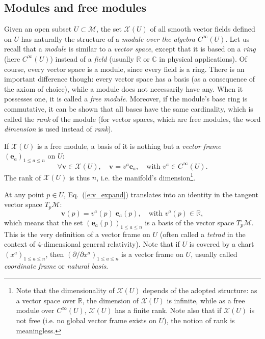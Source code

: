 \documentclass[a4paper]{jpconf}
\newcommand{\be}{\begin{equation}}
\newcommand{\ee}{\end{equation}}
\newcommand{\w}[1]{\bm{#1}}
\begin{document}
\subsection{Modules and free modules} \label{s:modules}

Given an open subset $U\subset\mathcal{M}$, the set $\mathscr{X}(U)$
of all smooth vector fields defined on $U$ has naturally the structure of a 
\emph{module over the algebra} $C^\infty(U)$.
Let us recall that a \emph{module} is similar to a \emph{vector space}, except that it is based
on a \emph{ring} (here $C^\infty(U)$)
instead of a \emph{field} (usually $\mathbb{R}$ or
$\mathbb{C}$ in physical applications). Of course, every vector space is a module,
since every field is a ring.
There is an important difference though: every vector space has a basis (as a 
consequence of the axiom of choice),
while a module does not necessarily have any. 
When it possesses one, it is called a \emph{free module}. 
Moreover, if the module's base ring is commutative, it can be shown that all
bases have the same
cardinality, which is called the \emph{rank} of the module 
(for vector spaces, which are free modules, the word \emph{dimension}
is used instead of \emph{rank}). 

If $\mathscr{X}(U)$ is a free module, a basis of it is nothing but a \emph{vector frame}
$(\w{e}_a)_{1\leq a \leq n}$ on $U$:
\be \label{e:v_expand}
    \forall \w{v}\in\mathscr{X}(U),\quad \w{v} = v^a \w{e}_a,\quad\mbox{with\ } v^a \in C^\infty(U) .
\ee
The rank of $\mathscr{X}(U)$ is thus $n$, i.e. the manifold's 
dimension\footnote{Note that the dimensionality of $\mathscr{X}(U)$ depends
of the adopted structure: as a vector space over $\mathbb{R}$, the
dimension of $\mathscr{X}(U)$ is infinite, while as a free module over
$C^\infty(U)$, $\mathscr{X}(U)$ has a finite rank. Note also that if $\mathscr{X}(U)$
is not free (i.e. no global vector frame exists on $U$), the notion of rank 
is meaningless.}.

At any point $p\in U$, Eq.~(\ref{e:v_expand}) translates into an identity in 
the tangent vector space $T_p \mathcal{M}$:
\be 
    \w{v}(p) = v^a(p)  \; \w{e}_a(p),\quad\mbox{with\ } v^a(p) \in \mathbb{R} , 
\ee
which means that 
the set $(\w{e}_a(p))_{1\leq a \leq n}$ is a basis of the vector space $T_p \mathcal{M}$.
This is the very definition of a vector frame on $U$ (often called a \emph{tetrad} in
the context of 4-dimensional general relativity). Note that if $U$ is covered
by a chart $(x^a)_{1\leq a \leq n}$, then $(\partial/\partial x^a)_{1\leq a \leq n}$
is a vector frame on $U$, usually called \emph{coordinate frame}
or \emph{natural basis}. 
\end{document}
